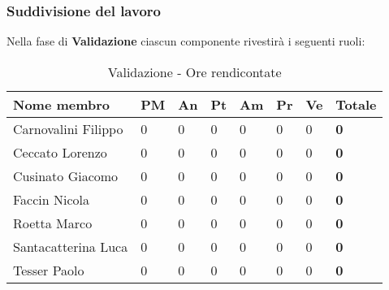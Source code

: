 		\subsubsection{Suddivisione del lavoro} %
		\label{ssub:suddivisione_del_lavoro}
		Nella fase di \textbf{Validazione} ciascun componente rivestirà i seguenti ruoli: \\
			\begin{table}[!h]
				\begin{center}
					\begin{tabularx}{0.9\textwidth}{|l|l|l|l|l|l|l|X|}
						\hline
						\textbf{Nome membro} & \textbf{PM} & \textbf{An} & \textbf{Pt} & \textbf{Am} & \textbf{Pr} & \textbf{Ve} & \textbf{Totale} \\
						\hline
						Carnovalini Filippo & 0 & 0 & 0 & 0 & 0 & 0 & \textbf{0} \\
						\hline
						Ceccato Lorenzo & 0 & 0 & 0 & 0 & 0 & 0 & \textbf{0} \\
						\hline
						Cusinato Giacomo & 0 & 0 & 0 & 0 & 0 & 0 & \textbf{0} \\
						\hline
						Faccin Nicola & 0 & 0 & 0 & 0 & 0 & 0 & \textbf{0} \\
						\hline
						Roetta Marco & 0 & 0 & 0 & 0 & 0 & 0 & \textbf{0} \\
						\hline
						Santacatterina Luca & 0 & 0 & 0 & 0 & 0 & 0 & \textbf{0} \\
						\hline
						Tesser Paolo & 0 & 0 & 0 & 0 & 0 & 0 & \textbf{0} \\
						\hline	
					\end{tabularx}
				\end{center}
			\caption{Validazione - Ore rendicontate}
			\end{table}
		
